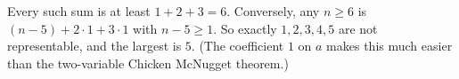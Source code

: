 Every such sum is at least $1+2+3=6$. Conversely, any $n\ge6$ is $(n-5)+2\cdot1+3\cdot1$ with $n-5\ge1$. So exactly $1,2,3,4,5$ are not representable, and the largest is $\boxed{5}$. (The coefficient $1$ on $a$ makes this much easier than the two-variable Chicken McNugget theorem.)
